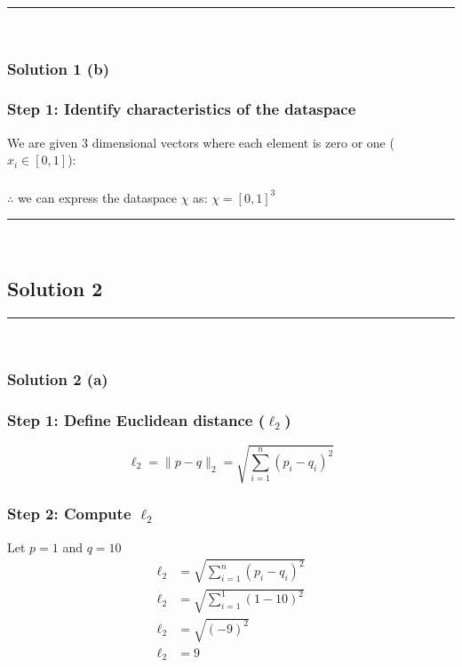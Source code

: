 \documentclass{article}
\begin{document}
\noindent\rule{\textwidth}{0.4pt}\\

\subsubsection*{Solution 1 (b)}
\subsubsection*{Step 1: Identify characteristics of the dataspace}
\parbox{\textwidth}{
We are given 3 dimensional vectors where each element is zero or one ($x_{i} \in [0,1]$):
}

\subsubsection*{\normalfont}{$\therefore$ we can express the dataspace $\chi$ as: $\chi = {[0,1]}^{3}$}

\noindent\rule{\textwidth}{0.4pt}\\

\newpage

\subsection*{Solution 2}
\noindent\rule{\textwidth}{0.4pt}\\
\subsubsection*{Solution 2 (a)}
\subsubsection*{Step 1: Define Euclidean distance ($\ell_2$)}
\parbox{\textwidth}{

$$\ell_2 = \|p - q\|_2 = \sqrt{\sum_{i=1}^{n} (p_i - q_i)^2}$$

}

\subsubsection*{Step 2: Compute $\ell_2$}
\parbox{\textwidth}{
Let $p=1$ and $q=10$
$$
\begin{aligned}
\ell_2 &= \sqrt{\sum_{i=1}^{n} (p_i - q_i)^2}\\
\ell_2 &= \sqrt{\sum_{i=1}^{1} (1 - 10)^2}\\
\ell_2 &= \sqrt{(- 9)^2}\\
\ell_2 &= 9
\end{aligned}
$$
}
\end{document}
